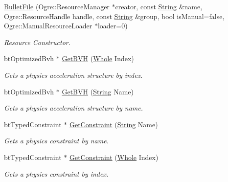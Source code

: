 \begin{DoxyCompactItemize}
\item 
\hyperlink{classMezzanine_1_1internal_1_1BulletFile_a6949f735118a623a291fe104e57e331a}{BulletFile} (Ogre::ResourceManager $\ast$creator, const \hyperlink{namespaceMezzanine_acf9fcc130e6ebf08e3d8491aebcf1c86}{String} \&name, Ogre::ResourceHandle handle, const \hyperlink{namespaceMezzanine_acf9fcc130e6ebf08e3d8491aebcf1c86}{String} \&group, bool isManual=false, Ogre::ManualResourceLoader $\ast$loader=0)
\begin{DoxyCompactList}\small\item\em Resource Constructor. \item\end{DoxyCompactList}\item 
btOptimizedBvh $\ast$ \hyperlink{classMezzanine_1_1internal_1_1BulletFile_a2dde44110919e77dc30f1d9bcb67f72c}{GetBVH} (\hyperlink{namespaceMezzanine_adcbb6ce6d1eb4379d109e51171e2e493}{Whole} Index)
\begin{DoxyCompactList}\small\item\em Gets a physics acceleration structure by index. \item\end{DoxyCompactList}\item 
btOptimizedBvh $\ast$ \hyperlink{classMezzanine_1_1internal_1_1BulletFile_ad65aa0b36affe887059183273892509e}{GetBVH} (\hyperlink{namespaceMezzanine_acf9fcc130e6ebf08e3d8491aebcf1c86}{String} Name)
\begin{DoxyCompactList}\small\item\em Gets a physics acceleration structure by name. \item\end{DoxyCompactList}\item 
btTypedConstraint $\ast$ \hyperlink{classMezzanine_1_1internal_1_1BulletFile_a19c9af33b87c133841c6e6e23959f201}{GetConstraint} (\hyperlink{namespaceMezzanine_acf9fcc130e6ebf08e3d8491aebcf1c86}{String} Name)
\begin{DoxyCompactList}\small\item\em Gets a physics constraint by name. \item\end{DoxyCompactList}\item 
btTypedConstraint $\ast$ \hyperlink{classMezzanine_1_1internal_1_1BulletFile_a36ae70fd657b6c0293b252abf52694a5}{GetConstraint} (\hyperlink{namespaceMezzanine_adcbb6ce6d1eb4379d109e51171e2e493}{Whole} Index)
\begin{DoxyCompactList}\small\item\em Gets a physics constraint by index. \item\end{DoxyCompactList}\item 

\end{DoxyCompactItemize}
